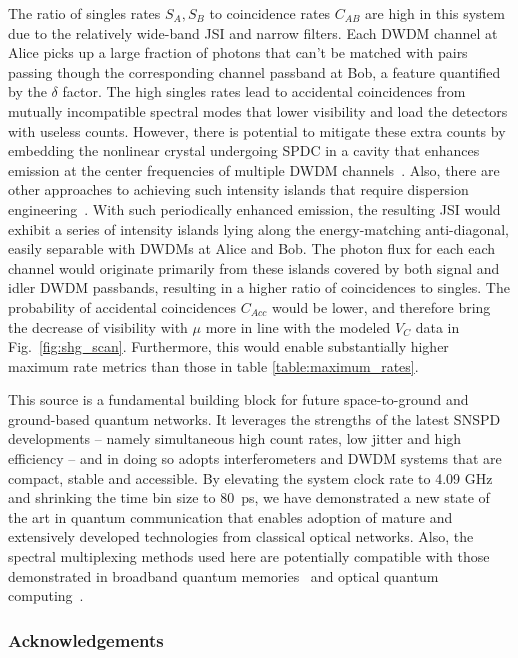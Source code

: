 \documentclass[11pt]{caltech_thesis} %
\begin{document}
The ratio of singles rates $S_A, S_B$ to coincidence rates $C_{AB}$ are high in this system due to the relatively wide-band JSI and narrow filters. Each DWDM channel at Alice picks up a large fraction of photons that can't be matched with pairs passing though the corresponding channel passband at Bob, a feature quantified by the $\delta$ factor. The high singles rates lead to accidental coincidences from mutually incompatible spectral modes that lower visibility and load the detectors with useless counts. However, there is potential to mitigate these extra counts by embedding the nonlinear crystal undergoing SPDC in a cavity that enhances emission at the center frequencies of multiple DWDM channels~\autocite{Pomarico2009,Brydges2023,slattery2019background}. Also, there are other approaches to achieving such intensity islands that require dispersion engineering~\autocite{morrison2022frequency,xin2022spectrally}. With such periodically enhanced emission, the resulting JSI would exhibit a series of intensity islands lying along the energy-matching anti-diagonal, easily separable with DWDMs at Alice and Bob. The photon flux for each each channel would originate primarily from these islands covered by both signal and idler DWDM passbands, resulting in a higher ratio of coincidences to singles. The probability of accidental coincidences $C_{Acc}$ would be lower, and therefore bring the decrease of visibility with $\mu$ more in line with the modeled $V_C$ data in Fig.~\ref{fig:shg_scan}. Furthermore, this would enable substantially higher maximum rate metrics than those in table \ref{table:maximum_rates}.

This source is a fundamental building block for future space-to-ground and ground-based quantum networks. It leverages the strengths of the latest SNSPD developments -- namely simultaneous high count rates, low jitter and high efficiency -- and in doing so adopts interferometers and DWDM systems that are compact, stable and accessible. By elevating the system clock rate to 4.09 GHz and shrinking the time bin size to 80~ps, we have demonstrated a new state of the art in quantum communication that enables adoption of mature and extensively developed technologies from classical optical networks. Also, the spectral multiplexing methods used here are potentially compatible with those demonstrated in broadband quantum memories~\autocite{Sinclair2014} and optical quantum computing~\autocite{lukens2017frequency}.

\hypertarget{acknowledgements}{%
\subsubsection{Acknowledgements}\label{acknowledgements}}
\end{document}
